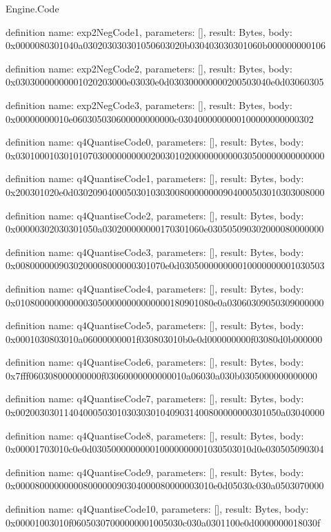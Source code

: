 \begin{lexlean}{Engine.Code}
\begin{semanticmodule}
definition{
  name: exp2NegCode1,
  parameters: [],
  result: Bytes,
  body: 0x0000080301040a030203030301050603020b030403030301060b000000000106
}

definition{
  name: exp2NegCode2,
  parameters: [],
  result: Bytes,
  body: 0x03030000000001020203000e03030e0d030300000000200503040e0d03060305
}

definition{
  name: exp2NegCode3,
  parameters: [],
  result: Bytes,
  body: 0x00000000010e060305030600000000000c0304000000000100000000000302
}

definition{
  name: q4QuantiseCode0,
  parameters: [],
  result: Bytes,
  body: 0x0301000103010107030000000000200301020000000000030500000000000000
}

definition{
  name: q4QuantiseCode1,
  parameters: [],
  result: Bytes,
  body: 0x200301020e0d0302090400050301030300800000000904000503010303008000
}

definition{
  name: q4QuantiseCode2,
  parameters: [],
  result: Bytes,
  body: 0x00000302030301050a030200000000170301060e030505090302000080000000
}

definition{
  name: q4QuantiseCode3,
  parameters: [],
  result: Bytes,
  body: 0x0080000009030200008000000301070e0d030500000000010000000001030503
}

definition{
  name: q4QuantiseCode4,
  parameters: [],
  result: Bytes,
  body: 0x01080000000000030500000000000000180901080e0a03060309050309000000
}

definition{
  name: q4QuantiseCode5,
  parameters: [],
  result: Bytes,
  body: 0x0001030803010a06000000001f030803010b0e0d000000000f03080d0b000000
}

definition{
  name: q4QuantiseCode6,
  parameters: [],
  result: Bytes,
  body: 0x7fff060308000000000f03060000000000010a06030a030b0305000000000000
}

definition{
  name: q4QuantiseCode7,
  parameters: [],
  result: Bytes,
  body: 0x0020030301140400050301030303010409031400800000000301050a03040000
}

definition{
  name: q4QuantiseCode8,
  parameters: [],
  result: Bytes,
  body: 0x00001703010c0e0d030500000000010000000001030503010d0e030505090304
}

definition{
  name: q4QuantiseCode9,
  parameters: [],
  result: Bytes,
  body: 0x00008000000000800000090304000080000003010e0d05030c030a0503070000
}

definition{
  name: q4QuantiseCode10,
  parameters: [],
  result: Bytes,
  body: 0x00001003010f06050307000000001005030c030a0301100e0d0000000018030f
}


\end{semanticmodule}
\end{lexlean}
